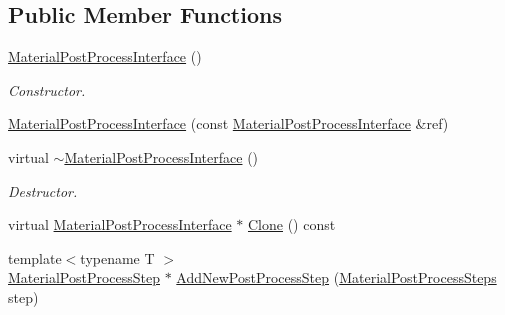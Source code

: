 \subsection*{Public Member Functions}
\begin{DoxyCompactItemize}
\item 
\mbox{\label{class_geometry_engine_1_1_custom_shading_1_1_material_post_process_interface_a2f0e83fa3f0b8a1382703dce1c385e69}} 
\mbox{\hyperlink{class_geometry_engine_1_1_custom_shading_1_1_material_post_process_interface_a2f0e83fa3f0b8a1382703dce1c385e69}{Material\+Post\+Process\+Interface}} ()
\begin{DoxyCompactList}\small\item\em Constructor. \end{DoxyCompactList}\item 
\mbox{\hyperlink{class_geometry_engine_1_1_custom_shading_1_1_material_post_process_interface_a7fc2078ff407e798f0f86834b1e71ced}{Material\+Post\+Process\+Interface}} (const \mbox{\hyperlink{class_geometry_engine_1_1_custom_shading_1_1_material_post_process_interface}{Material\+Post\+Process\+Interface}} \&ref)
\item 
\mbox{\label{class_geometry_engine_1_1_custom_shading_1_1_material_post_process_interface_ac933602c755f15c10dcdf75e8f0b5770}} 
virtual \mbox{\hyperlink{class_geometry_engine_1_1_custom_shading_1_1_material_post_process_interface_ac933602c755f15c10dcdf75e8f0b5770}{$\sim$\+Material\+Post\+Process\+Interface}} ()
\begin{DoxyCompactList}\small\item\em Destructor. \end{DoxyCompactList}\item 
virtual \mbox{\hyperlink{class_geometry_engine_1_1_custom_shading_1_1_material_post_process_interface}{Material\+Post\+Process\+Interface}} $\ast$ \mbox{\hyperlink{class_geometry_engine_1_1_custom_shading_1_1_material_post_process_interface_ad153baf46cac36c9af3c265c7348fd94}{Clone}} () const
\item 
{\footnotesize template$<$typename T $>$ }\\\mbox{\hyperlink{class_geometry_engine_1_1_custom_shading_1_1_material_post_process_step}{Material\+Post\+Process\+Step}} $\ast$ \mbox{\hyperlink{class_geometry_engine_1_1_custom_shading_1_1_material_post_process_interface_a85b59bfa41fa228f5b319f91f6645a6a}{Add\+New\+Post\+Process\+Step}} (\mbox{\hyperlink{namespace_geometry_engine_1_1_custom_shading_af8b09b91ca7086f4f67a5d4181f35e58}{Material\+Post\+Process\+Steps}} step)

\end{DoxyCompactItemize}
